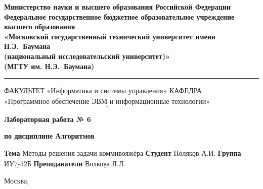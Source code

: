 \thispagestyle{empty}

\noindent\begin{minipage}{\textwidth}\centering
	\textbf{Министерство науки и высшего образования Российской Федерации}\\
	\textbf{Федеральное государственное бюджетное образовательное учреждение высшего образования}\\
	\textbf{«Московский государственный технический университет имени Н.Э.~Баумана}\\
	\textbf{(национальный исследовательский университет)»}\\
	\textbf{(МГТУ им. Н.Э.~Баумана)}
\end{minipage}

\noindent\rule{\linewidth}{3pt}
\newline\newline
\noindent ФАКУЛЬТЕТ $\underline{\text{«Информатика и системы управления»}}$ \newline\newline
\noindent КАФЕДРА $\underline{\text{«Программное обеспечение ЭВМ и информационные технологии»}}$

\vspace{1cm}

\begin{center}
	\noindent\centering
		\Large\textbf{Лабораторная работа № 6}
\end{center}

\begin{center}
	\noindent\centering
		\Large\textbf{по дисциплине  Алгоритмов\guillemotright}
\end{center}

\noindent\textbf{Тема} $\underline{\text{Методы решения задачи коммивояжёра}}$\newline\newline
\noindent\textbf{Студент} $\underline{\text{Поляков А.И.}}$\newline\newline
\noindent\textbf{Группа} $\underline{\text{ИУ7-52Б}}$\newline\newline
\noindent\textbf{Преподаватели} $\underline{\text{Волкова Л.Л.}}$\newline

\begin{center}
	\vfill
	Москва,~\the\year
\end{center}
\clearpage